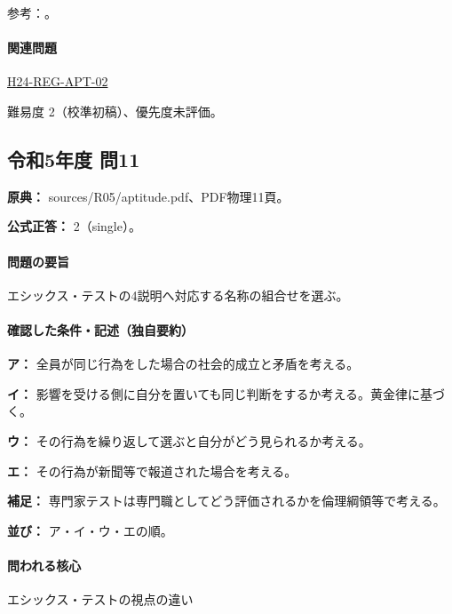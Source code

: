 \par 参考：\cite{ipej_ethics2011,mext_misconduct2014}。

\paragraph{関連問題} \hyperref[q:h24-reg-apt-02]{H24-REG-APT-02}

\par 難易度 2（校準初稿）、優先度未評価。

\subsection{令和5年度 問11}
\label{q:r05-reg-apt-11}

\noindent\textbf{原典：} sources/R05/aptitude.pdf、PDF物理11頁。

\textbf{公式正答：} 2（single）。

\paragraph{問題の要旨} エシックス・テストの4説明へ対応する名称の組合せを選ぶ。

\paragraph{確認した条件・記述（独自要約）}\mbox{}\par

\noindent\textbf{ア：} 全員が同じ行為をした場合の社会的成立と矛盾を考える。\par

\noindent\textbf{イ：} 影響を受ける側に自分を置いても同じ判断をするか考える。黄金律に基づく。\par

\noindent\textbf{ウ：} その行為を繰り返して選ぶと自分がどう見られるか考える。\par

\noindent\textbf{エ：} その行為が新聞等で報道された場合を考える。\par

\noindent\textbf{補足：} 専門家テストは専門職としてどう評価されるかを倫理綱領等で考える。\par

\noindent\textbf{並び：} ア・イ・ウ・エの順。\par

\paragraph{問われる核心} エシックス・テストの視点の違い

